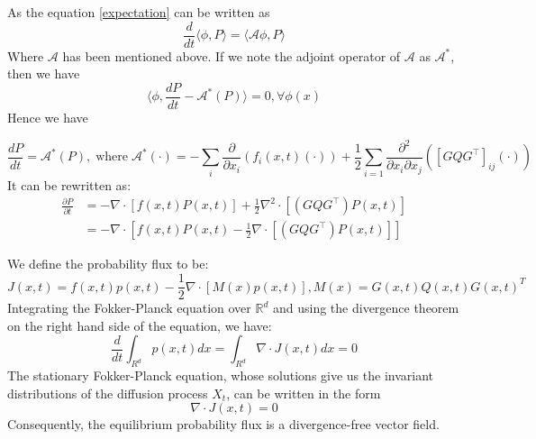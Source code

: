 As the equation \ref{expectation} can be written as 
\begin{equation}
    \frac{d}{dt}\langle\phi, P\rangle=\langle\mathcal{A}\phi, P\rangle
\end{equation}
Where $\mathcal{A}$ has been mentioned above. If we note the adjoint operator of $\mathcal{A}$ as $\mathcal{A}^*$, then we have
\begin{equation}
    \langle\phi, \frac{dP}{dt}-\mathcal{A}^*(P)\rangle=0,\forall \phi(x)
\end{equation}
Hence we have 
\begin{theorem}
    \begin{equation}
    \frac{dP}{dt}=\mathcal{A}^*(P),\operatorname{where} \mathcal{A}^*(\cdot)=-\sum_{i} \frac{\partial}{\partial x_{i}}\left(f_{i}(x, t) (\cdot)\right)+\frac{1}{2} \sum_{i=1} \frac{\partial^{2}}{\partial x_{i} \partial x_{j}}\left(\left[G Q G^{\top}\right]_{i j}(\cdot)\right)
\end{equation}
It can be rewritten as:
\begin{equation}
    \begin{aligned}
        \frac{\partial P}{\partial t} &= -\nabla\cdot\left[f(x, t) P(x, t)\right]+\frac{1}{2} \nabla^2\cdot\left[\left(G Q G^{\top}\right) P(x, t)\right] \\
        &=-\nabla\cdot\left[f(x, t) P(x, t)-\frac{1}{2} \nabla\cdot\left[\left(G Q G^{\top}\right) P(x, t)\right]\right]
    \end{aligned}
\end{equation}

We define the probability flux to be:
\begin{equation}
    J(x, t) = f(x, t) p(x, t)-\frac{1}{2} \nabla\cdot\left[M(x) p(x, t)\right], M(x)=G(x, t)Q(x, t)G(x, t)^T
\end{equation}
Integrating the Fokker-Planck equation over $\mathbb{R}^d$ and using the divergence theorem on the right hand side of  the equation, we have:
\begin{equation}
    \frac{d}{dt}\int_{R^d}p(x, t)dx=\int_{R^d}\nabla\cdot J(x, t)dx=0
\end{equation}
The stationary Fokker-Planck equation, whose solutions give us the invariant distributions of the diffusion process $X_t$, can be written in the form
\begin{equation}
    \nabla \cdot J(x, t)=0
\end{equation}
Consequently, the equilibrium probability flux is a divergence-free vector field.

\end{theorem}


